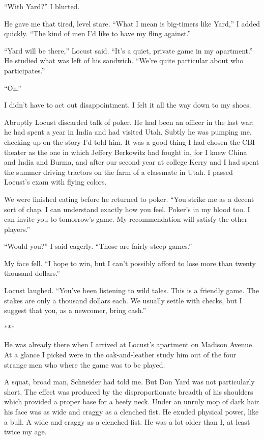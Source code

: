{“With Yard?” I blurted.

He gave me that tired, level stare. “What I mean is big-timers like Yard,” I added quickly. “The kind of men I’d like to have my fling against.”

“Yard will be there,” Locust said. “It’s a quiet, private game in my apartment.” He studied what was left of his sandwich. “We’re quite particular about who participates.”

“Oh.”

I didn’t have to act out disappointment. I felt it all the way down to my shoes.

Abruptly Locust discarded talk of poker. He had been an officer in the last war; he had spent a year in India and had visited Utah. Subtly he was pumping me, checking up on the story I’d told him. It was a good thing I had chosen the CBI theater as the one in which Jeffery Berkowitz had fought in, for I knew China and India and Burma, and after our second year at college Kerry and I had spent the summer driving tractors on the farm of a classmate in Utah. I passed Locust’s exam with flying colors.

We were finished eating before he returned to poker. “You strike me as a decent sort of chap. I can understand exactly how you feel. Poker’s in my blood too. I can invite you to tomorrow’s game. My recommendation will satisfy the other players.”

“Would you?” I said eagerly. “Those are fairly steep games.”

My face fell. “I hope to win, but I can’t possibly afford to lose more than twenty thousand dollars.”

Locust laughed. “You’ve been listening to wild tales. This is a friendly game. The stakes are only a thousand dollars each. We usually settle with checks, but I suggest that you, as a newcomer, bring cash.”

***

He was already there when I arrived at Locust’s apartment on Madison Avenue. At a glance I picked were in the oak-and-leather study him out of the four strange men who where the game was to be played.

A squat, broad man, Schneider had told me. But Don Yard was not particularly short. The effect was produced by the disproportionate breadth of his shoulders which provided a proper base for a beefy neck. Under an unruly mop of dark hair his face was as wide and craggy as a clenched fist. He exuded physical power, like a bull. A wide and craggy as a clenched fist. He was a lot older than I, at least twice my age.

}
